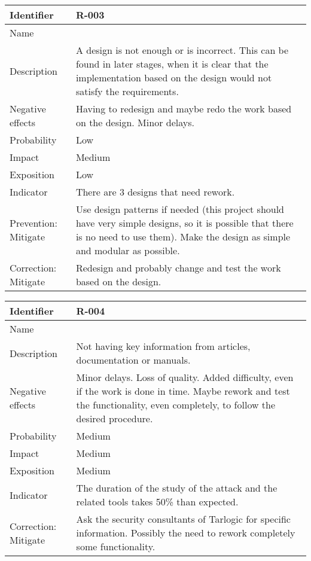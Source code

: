 \begin{table}[H]
	\begin{tabularx}{\textwidth}{|y|z|}
		\hline
		Identifier & \textbf{R-003} \\ \hline
		Name & \Rtres \\ \hline
		Description &
			A design is not enough or is incorrect. \linej
			This can be found in later stages, when it is clear that the implementation based on the design would not satisfy the requirements.
		\\ \hline
		Negative effects &
			Having to redesign and maybe redo the work based on the design. \linej
			Minor delays.
		\\ \hline
		Probability & Low\\ \hline
		Impact &  Medium\\ \hline
		Exposition & Low\\ \hline
		Indicator & There are 3 designs that need rework.\\ \hline
		Prevention: Mitigate &
			Use design patterns if needed (this project should have very simple designs, so it is possible that there is no need to use them). \linej
			Make the design as simple and modular as possible.
		\\ \hline
		Correction: Mitigate &
			Redesign and probably change and test the work based on the design.
		\\ \hline
	\end{tabularx}
\end{table}

\begin{table}[H]
	\begin{tabularx}{\textwidth}{|y|z|}
		\hline
		Identifier & \textbf{R-004} \\ \hline
		Name & \Rcuatro \\ \hline
		Description &
			Not having key information from articles, documentation or manuals.
		\\ \hline
		Negative effects &
			Minor delays. \linej
			Loss of quality. \linej
			Added difficulty, even if the work is done in time. \linej
			Maybe rework and test the functionality, even completely, to follow the desired procedure.
		\\ \hline
		Probability & Medium\\ \hline
		Impact &  Medium\\ \hline
		Exposition &  Medium\\ \hline
		Indicator & The duration of the study of the attack and the related tools takes 50\% than expected. \\ \hline
		Correction: Mitigate &
			Ask the security consultants of Tarlogic for specific information. \linej
			Possibly the need to rework completely some functionality.
		\\ \hline
	\end{tabularx}
\end{table}

